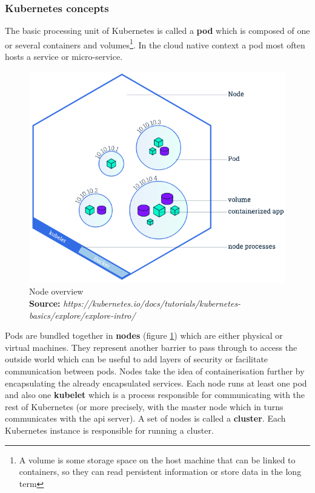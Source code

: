 \documentclass[12pt]{report}
\newcommand*{\captionsource}[2]{%
    \caption[{#1}]{%
        #1%
        \\\hspace{\linewidth}%
	\textbf{Source:} \textit{#2}%
    }%
}
\begin{document}
\subsubsection{Kubernetes concepts}
The basic processing unit of Kubernetes is called a \textbf{pod} which is
composed of one or several containers and volumes\footnote{A volume is some
	storage space on the host machine that can be linked to containers, so
	they can read persistent information or store data in the long term}.
In the cloud native context a pod most often hosts a service or micro-service.

\begin{figure}[h]
	\centering
	\includegraphics[scale=0.5]{../imgs/node-overview.png}
	\captionsource{Node overview}{https://kubernetes.io/docs/tutorials/kubernetes-basics/explore/explore-intro/}
	\label{fig:node-overview}
\end{figure}

Pods are bundled together in \textbf{nodes} (figure \ref{fig:node-overview})
which are either physical or virtual machines. They represent another barrier
to pass through to access the outside world which can be useful to add layers
of security or facilitate communication between pods. Nodes take the idea of
containerisation further by encapsulating the already encapsulated services.
Each node runs at least one pod and also one \textbf{kubelet} which is a
process responsible for communicating with the rest of Kubernetes (or more
precisely, with the master node which in turns communicates with the api
server). A set of nodes is called a \textbf{cluster}. Each Kubernetes instance
is responsible for running a cluster.
\end{document}
